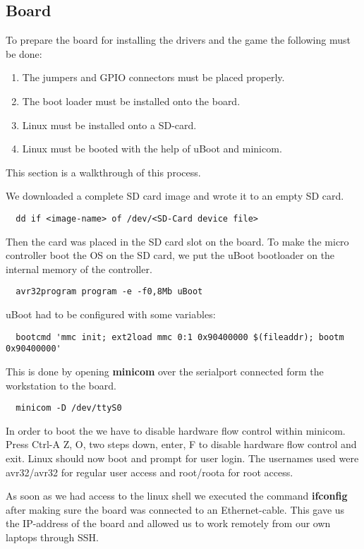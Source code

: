 \subsection{Board}
\label{sec:boardsetup}

To prepare the board for installing the drivers and the game the following must be done:
\begin{enumerate}
  \item The jumpers and GPIO connectors must be placed properly.
  \item The boot loader must be installed onto the board.
  \item Linux must be installed onto a SD-card.
  \item Linux must be booted with the help of uBoot and minicom.
\end{enumerate}

This section is a walkthrough of this process.

We downloaded a complete SD card image and wrote it to an empty SD card.
\begin{verbatim}
  dd if <image-name> of /dev/<SD-Card device file>
\end{verbatim}
Then the card was placed in the SD card slot on the board. To make the micro controller boot
the OS on the SD card, we put the uBoot bootloader on the internal memory of the controller.
\begin{verbatim}
  avr32program program -e -f0,8Mb uBoot
\end{verbatim}
uBoot had to be configured with some variables:
\begin{verbatim}
  bootcmd 'mmc init; ext2load mmc 0:1 0x90400000 $(fileaddr); bootm 0x90400000'
\end{verbatim}
This is done by opening {\bf minicom} over the serialport connected form the workstation to the board.
\begin{verbatim}
  minicom -D /dev/ttyS0
\end{verbatim}
In order to boot the we have to disable hardware flow control within minicom.
Press Ctrl-A Z, O, two steps down, enter, F to disable hardware flow control and exit.
Linux should now boot and prompt for user login. The usernames used were avr32/avr32 for
regular user access and root/roota for root access.

As soon as we had access to the linux shell we executed the command {\bf ifconfig} after
making sure the board was connected to an Ethernet-cable. This gave us the IP-address of the
board and allowed us to work remotely from our own laptops through SSH.
